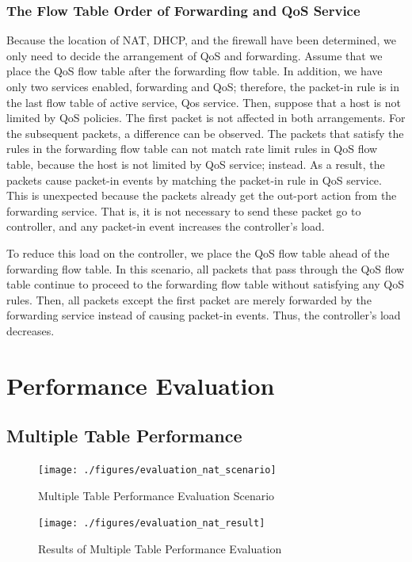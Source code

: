 \documentclass[conference]{IEEEtran}
\begin{document}
\subsubsection{The Flow Table Order of Forwarding and QoS Service}
Because the location of NAT, DHCP, and the firewall have been determined, we only need to decide the arrangement of QoS and forwarding. Assume that we place the QoS flow table after the forwarding flow table. In addition, we have only two services enabled, forwarding and QoS; therefore, the packet-in rule is in the last flow table of active service, Qos service. Then, suppose that a host is not limited by QoS policies. The first packet is not affected in both arrangements. For the subsequent packets, a difference can be observed. The packets that satisfy the rules in the forwarding flow table can not match rate limit rules in QoS flow table, because the host is not limited by QoS service; instead. As a result, the packets cause packet-in events by matching the packet-in rule in QoS service. This is unexpected because the packets already get the out-port action from the forwarding service. That is, it is not necessary to send these packet go to controller, and any packet-in event increases the controller’s load.

To reduce this load on the controller, we place the QoS flow table ahead of the forwarding flow table. In this scenario, all packets that pass through the QoS flow table continue to proceed to the forwarding flow table without satisfying any QoS rules. Then, all packets except the first packet are merely forwarded by the forwarding service instead of causing packet-in events. Thus, the controller’s load decreases.

\section{Performance Evaluation}
\subsection{Multiple Table Performance}

\begin{figure}[!t]
\centering
\texttt{[image: ./figures/evaluation\_nat\_scenario]}
\caption{Multiple Table Performance Evaluation Scenario}
\label{fig:evaluation_nat_scenario}
\end{figure}

\begin{figure}[!t]
\centering
\texttt{[image: ./figures/evaluation\_nat\_result]}
\caption{Results of Multiple Table Performance Evaluation}
\label{fig:evaluation_nat_result}
\end{figure}
\end{document}
